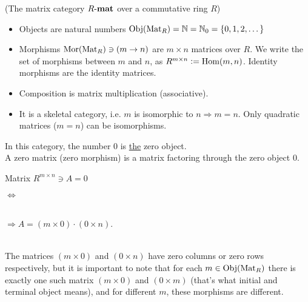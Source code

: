 \begin{example}{(The matrix category $R\textnormal{-}\mathbf{mat}$ over a commutative ring $R$)}\label{ex:matrix_category}
\begin{itemize}
\item Objects are natural numbers $\textup{Obj}(\textup{Mat}_{R}) = \mathbb{N} = \mathbb{N}_{0} = \{0,1,2,\dots\}$
\item Morphisms $\textup{Mor}(\textup{Mat}_{R}) \ni (m \rightarrow n)$ are $m \times n$ matrices over $R$.
We write the set of morphisms between $m$ and $n$, as $R^{m\times n} := \textup{Hom}(m,n)$. Identity morphisms are the
identity matrices.
\item Composition is matrix multiplication (associative).
\item It is a skeletal category, i.e. $m$ is isomorphic to $n \Rightarrow m = n$. Only quadratic matrices ($m = n$) can be
isomorphisms.
\end{itemize}
In this category, the number $0$ is \ul{the} zero object.\\
A zero matrix (zero morphism) is a matrix factoring through the zero object $0$.\\
\begin{minipage}{.2\textwidth}\phantom{ }\end{minipage}
\begin{minipage}{.25\textwidth}
Matrix $R^{m\times n} \ni A = 0$
\end{minipage}
\begin{minipage}{.08\textwidth}
$\Longleftrightarrow$
\end{minipage}
\begin{minipage}{.32\textwidth}
\\
$\Rightarrow A = (m \times 0) \cdot (0 \times n)$.
\end{minipage}
\begin{minipage}{.15\textwidth}\phantom{ }\end{minipage}\\
\noindent The matrices $(m \times 0)$ and $(0 \times n)$ have zero columns or zero rows respectively, but it is
important to note that for each $m \in \textup{Obj}(\textup{Mat}_{R})$ there is exactly one such matrix $(m \times 0)$ and $(0 \times m)$
(that's what initial and terminal object means), and for different $m$, these morphisms are different.
\end{example}


